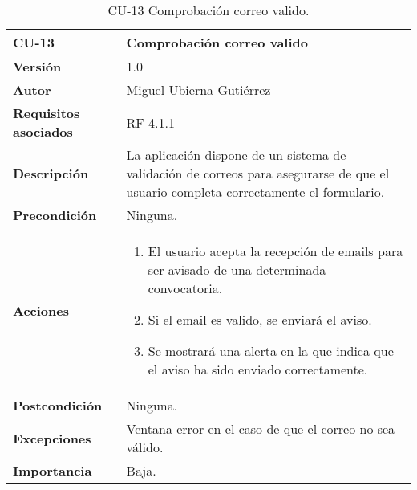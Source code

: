 \begin{table}[p]
	\centering
	\begin{tabularx}{\linewidth}{ p{} p{} }
		\toprule
		\textbf{CU-13}    & \textbf{Comprobación correo valido}\\
		\toprule
		\textbf{Versión}              & 1.0    \\
		\textbf{Autor}                & Miguel Ubierna Gutiérrez \\
		\textbf{Requisitos asociados} & RF-4.1.1  \\
		\textbf{Descripción}          & La aplicación dispone de un sistema de validación de correos para asegurarse de que el usuario completa correctamente el formulario.  \\
		\textbf{Precondición}         & Ninguna.\\
		\textbf{Acciones}             &
		\begin{enumerate}
			\def\labelenumi{\arabic{enumi}.}
			\tightlist
			\item El usuario acepta la recepción de emails para ser avisado de una determinada convocatoria.
                \item Si el email es valido, se enviará el aviso.
                \item Se mostrará una alerta en la que indica que el aviso ha sido enviado correctamente.
		\end{enumerate}\\
		\textbf{Postcondición}        & Ninguna. \\
		\textbf{Excepciones}          & Ventana error en el caso de que el correo no sea válido. \\
		\textbf{Importancia}          & Baja.  \\
		\bottomrule
	\end{tabularx}
	\caption{CU-13 Comprobación correo valido.}
\end{table}


